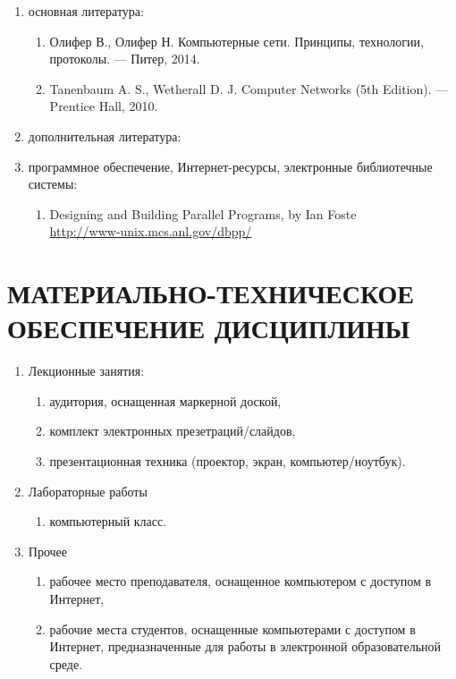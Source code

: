 \begin{enumerate}
\item основная литература:
\begin{enumerate}
\item \label{olifer} Олифер В., Олифер Н. Компьютерные сети. Принципы, технологии, протоколы. — Питер, 2014. \item \label{tanenbaum-eng} Tanenbaum A. S., Wetherall D. J. Computer Networks (5th Edition). — Prentice Hall, 2010.
\end{enumerate}
 \item дополнительная литература:

 \item программное обеспечение, Интернет-ресурсы, электронные библиотечные системы:
\begin{enumerate}[resume]
\item \label{www1} Designing and Building Parallel Programs, by Ian Foste\\ \url{http://www-unix.mcs.anl.gov/dbpp/}
\end{enumerate}
\end{enumerate}

\newpage
\section{МАТЕРИАЛЬНО-ТЕХНИЧЕСКОЕ ОБЕСПЕЧЕНИЕ ДИСЦИПЛИНЫ}


\begin{enumerate}
\item Лекционные занятия:
\begin{enumerate}
\item аудитория, оснащенная маркерной доской, \item комплект электронных презетраций/слайдов, \item презентационная техника (проектор, экран, компьютер/ноутбук).
\end{enumerate}
\item Лабораторные работы
\begin{enumerate}
\item компьютерный класс.
\end{enumerate}
\item Прочее
\begin{enumerate}
\item рабочее место преподавателя, оснащенное компьютером с доступом в Интернет, \item рабочие места студентов, оснащенные компьютерами с доступом в Интернет, предназначенные для работы в электронной образовательной среде.
\end{enumerate}
\end{enumerate}

